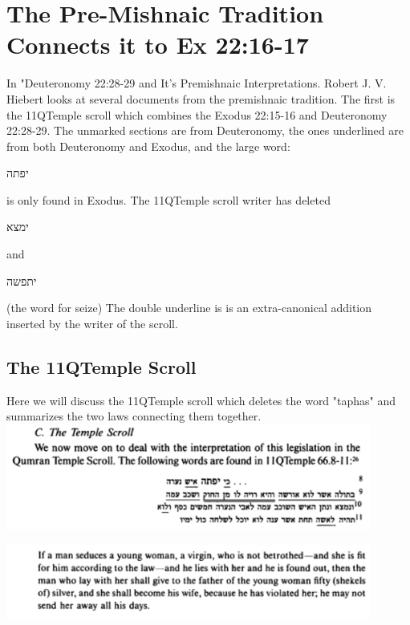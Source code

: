 \documentclass[11pt]{article}
\begin{document}
\section{The Pre-Mishnaic Tradition Connects it to Ex 22:16-17}
In "Deuteronomy 22:28-29 and It's Premishnaic Interpretations. Robert J. V. Hiebert looks at several documents from the premishnaic tradition. The first is the 11QTemple scroll which combines the Exodus 22:15-16 and Deuteronomy 22:28-29. The unmarked sections are from Deuteronomy, the ones underlined are from both Deuteronomy and Exodus, and the large word: \begin{hebrew}יפתה\end{hebrew} is only found in Exodus. The 11QTemple scroll writer has deleted \begin{hebrew}ימצא\end{hebrew} and \begin{hebrew}יתפשה\end{hebrew} (the word for seize) The double underline is is an extra-canonical addition inserted by the writer of the scroll. 


\subsection{The 11QTemple Scroll}
Here we will discuss the 11QTemple scroll which deletes the word "taphas" and summarizes the two laws connecting them together. \newline
\includegraphics[width=12cm]{temple_scroll1}

\includegraphics[width=12cm]{dead_sea_scrolls}
\end{document}
